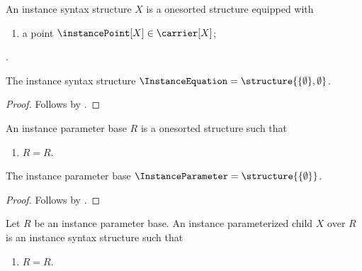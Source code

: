 \begin{struct}\label{instance_syntax_structure}
    An instance syntax structure $X$ is a onesorted structure equipped with
    \begin{enumerate}
        \item\label{instance_syntax_point}
            a point $\instancePoint[X]\in\carrier[X]$;
    \end{enumerate}
    .
\end{struct}

\begin{instance}\label{instance_equation_surface}
    The instance syntax structure
    $\InstanceEquation=\structure{\{\emptyset\},\emptyset}$.
\end{instance}
\begin{proof}
    Follows by
    .
\end{proof}

\begin{struct}\label{instance_parameter_base}
    An instance parameter base $R$ is a onesorted structure such that
    \begin{enumerate}
        \item\label{instance_parameter_base_refl} $R=R$.
    \end{enumerate}
\end{struct}

\begin{instance}\label{instance_parameter_object}
    The instance parameter base
    $\InstanceParameter=\structure{\{\emptyset\}}$.
\end{instance}
\begin{proof}
    Follows by
    .
\end{proof}

\begin{struct}\label{instance_parameterized_child}
    Let $R$ be an instance parameter base.
    An instance parameterized child $X$ over $R$ is an instance syntax
    structure such that
    \begin{enumerate}
        \item\label{instance_parameterized_child_refl} $R=R$.
    \end{enumerate}
\end{struct}

